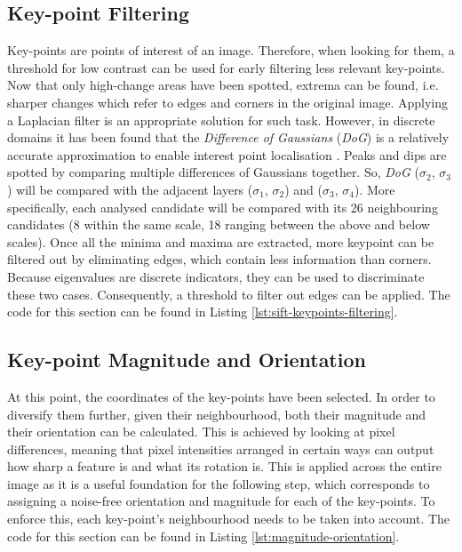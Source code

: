 \documentclass[a4paper,11pt,twocolumn]{article}
\begin{document}
\subsection{Key-point Filtering}
Key-points are points of interest of an image. Therefore, when looking for them, a threshold for low contrast can be used for early filtering less relevant key-points. Now that only high-change areas have been spotted, extrema can be found, i.e. sharper changes which refer to edges and corners in the original image. Applying a Laplacian filter is an appropriate solution for such task. However, in discrete domains it has been found that the \textit{Difference of Gaussians} (\textit{DoG}) is a relatively accurate approximation to enable interest point localisation \citep{lowe1999object}. Peaks and dips are spotted by comparing multiple differences of Gaussians together. So, \textit{DoG} ($\sigma_{2}$, $\sigma_{3}$) will be compared with the adjacent layers ($\sigma_{1}$, $\sigma_{2}$) and ($\sigma_{3}$, $\sigma_{4}$). More specifically, each analysed candidate will be compared with its 26 neighbouring candidates (8 within the same scale, 18 ranging between the above and below scales). Once all the minima and maxima are extracted, more keypoint can be filtered out by eliminating edges, which contain less information than corners. Because eigenvalues are discrete indicators, they can be used to discriminate these two cases. Consequently, a threshold to filter out edges can be applied. The code for this section can be found in Listing \ref{lst:sift-keypoints-filtering}. 

\subsection{Key-point Magnitude and Orientation}
At this point, the coordinates of the key-points have been selected. In order to diversify them further, given their neighbourhood, both their magnitude and their orientation can be calculated. This is achieved by looking at pixel differences, meaning that pixel intensities arranged in certain ways can output how sharp a feature is and what its rotation is. This is applied across the entire image as it is a useful foundation for the following step, which corresponds to assigning a noise-free orientation and magnitude for each of the key-points. To enforce this, each key-point's neighbourhood needs to be taken into account. The code for this section can be found in Listing  \ref{lst:magnitude-orientation}.\\
\end{document}
